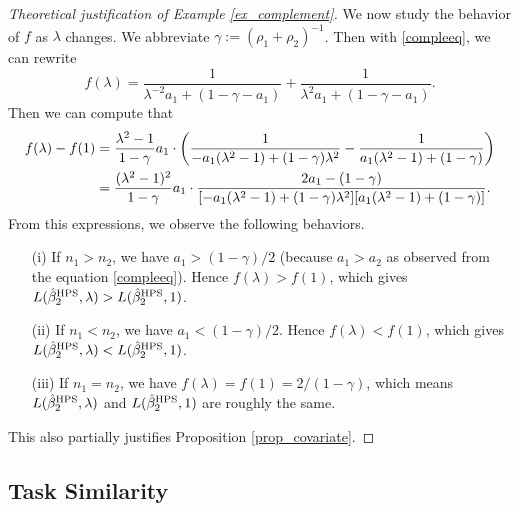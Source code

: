 \begin{proof}[Theoretical justification of Example \ref{ex_complement}]
We now study the behavior of $f$ as $\lambda$ changes. 
We abbreviate $\gamma:=(\rho_1 + \rho_2)^{-1}$. Then with \eqref{compleeq}, we can rewrite
$$f(\lambda)= \frac{1}{\lambda^{-2}{a_1} + (1-\gamma - a_1)} + \frac{1}{\lambda^2a_1 + (1-\gamma - a_1)}.$$
Then we can compute that
\begin{align*}
f(\lambda) - f(1)&= \frac{ \lambda^2-1}{1-\gamma} a_1\cdot \left({  \frac{1}{ -a_1(\lambda^2-1)+(1-\gamma)\lambda^2 } - \frac{1}{a_1(\lambda^2-1) + (1-\gamma)}}\right) \\
&= \frac{(\lambda^2-1)^2}{1-\gamma}  a_1\cdot  \frac{2a_1 - (1-\gamma) }{[-a_1(\lambda^2-1)+(1-\gamma)\lambda^2 ][a_1(\lambda^2-1) + (1-\gamma)]} .
\end{align*}
From this expressions, we observe the following behaviors.
\begin{itemize}
\item[(i)] If $n_1>n_2$, we have $a_1>(1-\gamma)/2$ (because $a_1>a_2$ as observed from the equation \eqref{compleeq}). Hence $f(\lambda)>f(1)$, which gives $L(\hat \beta_{2}^{\textup{HPS}},\lambda)>L(\hat \beta_{2}^{\textup{HPS}},1)$.

\item[(ii)] If $n_1< n_2$, we have $a_1< (1-\gamma)/2$. Hence $f(\lambda)< f(1)$, which gives $L(\hat \beta_{2}^{\textup{HPS}},\lambda)<L(\hat \beta_{2}^{\textup{HPS}},1)$. 

\item[(iii)] If $n_1=n_2$, we have $f(\lambda)=f(1)=2/(1-\gamma)$, which means $L(\hat \beta_{2}^{\textup{HPS}},\lambda)$ and $L(\hat \beta_{2}^{\textup{HPS}},1)$ are roughly the same. %
\end{itemize}
This also partially justifies Proposition \ref{prop_covariate}. %
\end{proof}
\fi
 


\iffalse
\subsection{Task Similarity}\label{app_proof_31}

